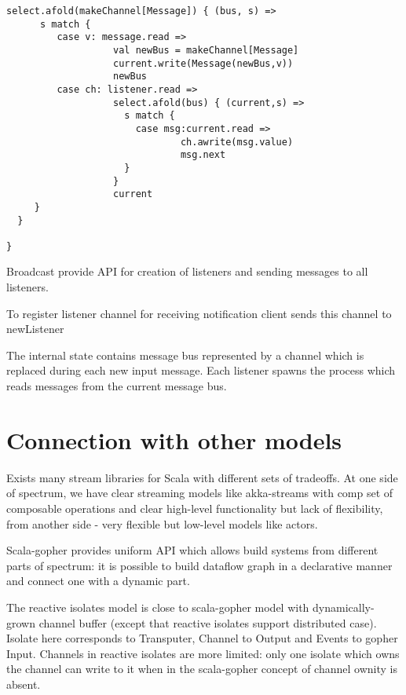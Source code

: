 \documentclass[12pt]{article}
\begin{document}
\begin{itemize}
\begin{Verbatim}[fontsize=\small]
   select.afold(makeChannel[Message]) { (bus, s) =>
      s match {
         case v: message.read =>
                   val newBus = makeChannel[Message]
                   current.write(Message(newBus,v))
                   newBus
         case ch: listener.read =>          
                   select.afold(bus) { (current,s) =>
                     s match {
                       case msg:current.read =>
                               ch.awrite(msg.value) 
                               msg.next
                     }
                   } 
                   current
     } 
  }

}
\end{Verbatim}

 Broadcast provide API for creation of listeners and sending messages to all listeners.

To register listener channel for receiving notification client sends this channel to newListener
  
 The internal state contains message bus represented by a channel which is replaced during each new input message. Each listener spawns the process which reads messages from the current message bus.


\end{itemize}

 
\section{ Connection with other models }

 Exists many stream libraries for Scala with different sets of tradeoffs. At one side of
spectrum, we have clear streaming models like akka-streams\cite{akka-streams} with comp set
of composable operations and clear high-level functionality but lack of flexibility,
from another side - very flexible but low-level models like actors.

 Scala-gopher provides uniform API which allows build systems from different parts of spectrum:
it is possible to build dataflow graph in a declarative manner and connect one with a dynamic part.

 The reactive isolates model\cite{Prokopec:2015:ICE:2814228.2814245} is close to scala-gopher model with dynamically-grown channel buffer (except that reactive isolates support distributed case).
 Isolate here corresponds to Transputer, Channel to Output and Events to gopher Input. Channels in reactive isolates are more limited: only one isolate which owns the channel can write to it when in the scala-gopher concept of channel ownity is absent. 
\end{document}

